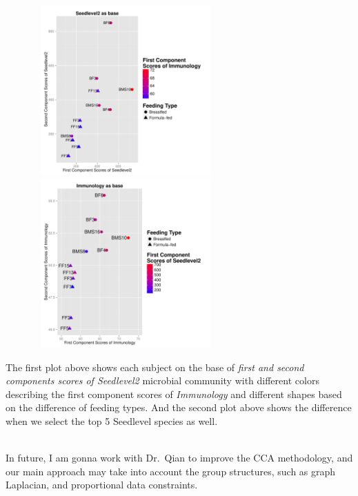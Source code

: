 \documentclass[12pt]{article}\usepackage[]{graphicx}\usepackage[]{color}
\newenvironment{knitrout}{}{} %
\begin{document}
\begin{knitrout}
\color{fgcolor}

{\centering \includegraphics[width=9.2cm,height=6.5cm]{figure/plot-1} 
\includegraphics[width=9.2cm,height=6.5cm]{figure/plot-2} 

}



\end{knitrout}
The first plot above shows each subject on the base of \textit{first and second components scores of Seedlevel2} microbial community with different colors describing the first component scores of \textit{Immunology} and different shapes based on the difference of feeding types. And the second plot above shows the difference when we select the top 5 Seedlevel species as well.   \\  $ $ \par
In future, I am gonna work with Dr.~Qian to improve the CCA methodology, and our main approach may take into account the group structures, such as graph Laplacian,  and proportional data constraints.
\end{document}
